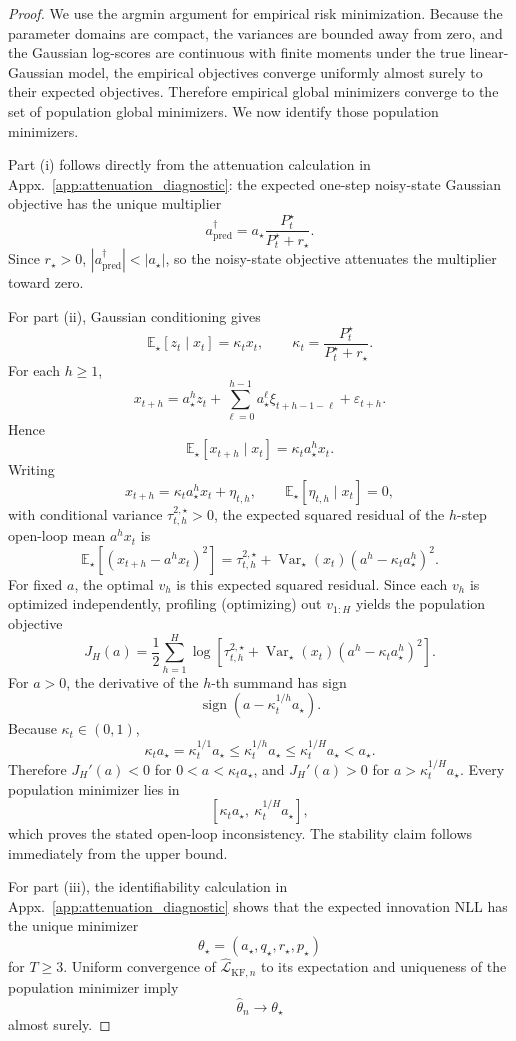 \documentclass{article}
\theoremstyle{plain}
\theoremstyle{definition}
\theoremstyle{remark}
\newcommand{\E}{\mathbb{E}}
\begin{document}
\begin{proof}
We use the argmin argument for empirical risk minimization. Because the
parameter domains are compact, the variances are bounded away from zero, and the
Gaussian log-scores are continuous with finite moments under the true
linear-Gaussian model, the empirical objectives converge uniformly almost surely
to their expected objectives. Therefore empirical global minimizers converge to
the set of population global minimizers. We now identify those population
minimizers.

Part (i) follows directly from the attenuation calculation in Appx.~\ref{app:attenuation_diagnostic}: the expected one-step noisy-state
Gaussian objective has the unique multiplier
\[
a_{\mathrm{pred}}^\dagger
=
a_\star\frac{P_t^\star}{P_t^\star+r_\star}.
\]
Since $r_\star>0$, $|a_{\mathrm{pred}}^\dagger|<|a_\star|$, so the noisy-state objective attenuates the multiplier toward zero. 

For part \textnormal{(ii)}, Gaussian conditioning gives
\[
\E_\star[z_t\mid x_t]
=
\kappa_t x_t,
\qquad
\kappa_t
=
\frac{P_t^\star}{P_t^\star+r_\star}.
\]
For each $h\ge1$,
\[
x_{t+h}
=
a_\star^h z_t
+
\sum_{\ell=0}^{h-1}
a_\star^\ell \xi_{t+h-1-\ell}
+
\varepsilon_{t+h}.
\]
Hence
\[
\E_\star[x_{t+h}\mid x_t]
=
\kappa_t a_\star^h x_t.
\]
Writing
\[
x_{t+h}
=
\kappa_t a_\star^h x_t+\eta_{t,h},
\qquad
\E_\star[\eta_{t,h}\mid x_t]=0,
\]
with conditional variance $\tau_{t,h}^{2,\star}>0$, the expected squared
residual of the $h$-step open-loop mean $a^h x_t$ is
\[
\E_\star[(x_{t+h}-a^h x_t)^2]
=
\tau_{t,h}^{2,\star}
+
\operatorname{Var}_\star(x_t)
\left(a^h-\kappa_t a_\star^h\right)^2.
\]
For fixed $a$, the optimal $v_h$ is this expected squared residual. Since each $v_h$ is optimized independently, profiling (optimizing) out $v_{1:H}$ yields the population objective
\[
J_H(a)
=
\frac12\sum_{h=1}^H
\log \left[
\tau_{t,h}^{2,\star}
+
\operatorname{Var}_\star(x_t)
\left(a^h-\kappa_t a_\star^h\right)^2
\right].
\]
For $a>0$, the derivative of the $h$-th summand has sign
\[
\operatorname{sign}
 \left(a-\kappa_t^{1/h}a_\star\right).
\]
Because $\kappa_t\in(0,1)$,
\[
\kappa_t a_\star
=
\kappa_t^{1/1}a_\star
\le
\kappa_t^{1/h}a_\star
\le
\kappa_t^{1/H}a_\star
<
a_\star .
\]
Therefore $J_H'(a)<0$ for $0<a<\kappa_t a_\star$, and
$J_H'(a)>0$ for $a>\kappa_t^{1/H}a_\star$. Every population minimizer lies in
\[
[\kappa_t a_\star,\ \kappa_t^{1/H}a_\star],
\]
which proves the stated open-loop inconsistency. The stability claim follows
immediately from the upper bound.

For part (iii), the identifiability calculation in Appx.~\ref{app:attenuation_diagnostic} shows that the expected innovation NLL has the unique minimizer
\[
\theta_\star=(a_\star,q_\star,r_\star,p_\star)
\]
for $T\ge3$. Uniform convergence of
$\widehat{\mathcal L}_{\mathrm{KF},n}$ to its expectation and uniqueness of
the population minimizer imply
\[
\hat\theta_n\to\theta_\star
\]
almost surely.
\end{proof}
\end{document}
